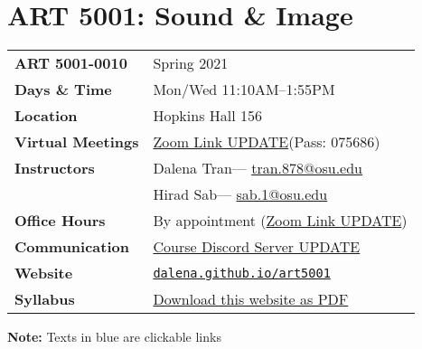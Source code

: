 \documentclass[10pt,letter,english]{article}
\makeatletter
\def\courseCode{ART 5001}
\def\courseTitle{ART 5001: Sound \& Image}
\def\courseNumber{ART 5001-0010}
\def\courseSemester{Spring 2021}
\def\courseTime{Mon/Wed 11:10AM--1:55PM}
\def\courseLocation{Hopkins Hall 156}
\def\dalena{Dalena Tran}
\def\dalenaURL{tran.878@osu.edu}
\def\dalenaEmail{\href{mailto:\dalenaURL}{{\dalenaURL}}}
\def\hirad{Hirad Sab}
\def\hiradURL{sab.1@osu.edu}
\def\hiradEmail{\href{mailto:\hiradURL}{{\hiradURL}}}
\def\zoomURL{https://osu.zoom.us/j/92337296593?pwd=ZUFScERqWkFBcEFrcXNDR053QnFSUT09}
\def\zoomText{\href{\zoomURL}{{Zoom Link UPDATE}}}
\def\discordURL{https://discord.gg/SDQJkA6}
\def\discordText{\href{\discordURL}{{Course Discord Server UPDATE}}}
\def\syllabusURL{https://github.com/dalena/art5001/raw/master/index.pdf}
\def\syllabusDownloadText{\href{\syllabusURL}{\small{Download this website as PDF}}}
\def\websiteURL{https://dalena.github.io/art5001/}
\def\websiteText{\href{\websiteURL}{\small{\texttt{dalena.github.io/art5001}}}}
\makeatother
\begin{document}
\section[\courseCode]{\courseTitle}

\begin{tabularx}{\textwidth}{@{}l X@{}}
      \textbf{\courseNumber}     & \courseSemester            \\
      \textbf{Days \& Time}      & \courseTime                \\
      \textbf{Location}          & \courseLocation            \\
      \textbf{Virtual Meetings}  & \zoomText (Pass: 075686)                  \\
      \textbf{Instructors}       & \dalena --- \dalenaEmail   \\
                                 & \hirad --- \hiradEmail     \\
      \textbf{Office Hours}      & By appointment (\zoomText) \\
      \textbf{Communication}     & \discordText               \\
      \textbf{Website}           & \websiteText               \\
      \textbf{Syllabus}          & \syllabusDownloadText      \\

\end{tabularx}

\small{\textbf{Note:} Texts in \textcolor{defaultColor}{blue} are clickable links}



\clearpage



\clearpage



\clearpage



\clearpage


\end{document}
